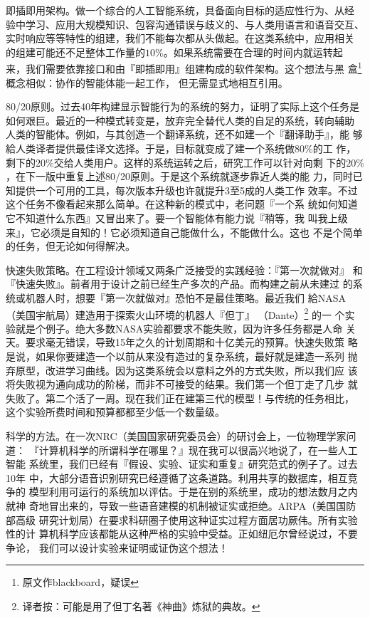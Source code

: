 \documentclass[12pt,a4paper]{article}
\begin{document}
即插即用架构。做一个综合的人工智能系统，具备面向目标的适应性行为、从经
验中学习、应用大规模知识、包容沟通错误与歧义的、与人类用语言和语音交互、
实时响应等等特性的组建，我们不能每次都从头做起。在这类系统中，应用相关
的组建可能还不足整体工作量的$10\%$。如果系统需要在合理的时间内就运转起
来，我们需要依靠接口和由『即插即用』组建构成的软件架构。这个想法与黑
盒\footnote{原文作blackboard，疑误} 概念相似：协作的智能体能一起工作，
但无需显式地相互引用。

80/20原则。过去40年构建显示智能行为的系统的努力，证明了实际上这个任务是
如何艰巨。最近的一种模式转变是，放弃完全替代人类的自足的系统，转向辅助
人类的智能体。例如，与其创造一个翻译系统，还不如建一个『翻译助手』，能
够給人类译者提供最佳译文选择。于是，目标就变成了建一个系统做$80\%$的工
作，剩下的$20\%$交给人类用户。这样的系统运转之后，研究工作可以针对向剩
下的$20\%$，在下一版中重复上述80/20原则。于是这个系统就逐步靠近人类的能
力，同时已知提供一个可用的工具，每次版本升级也许就提升3至5成的人类工作
效率。不过这个任务不像看起来那么简单。在这种新的模式中，老问题『一个系
统如何知道它不知道什么东西』又冒出来了。要一个智能体有能力说『稍等，我
叫我上级来』，它必须是自知的！它必须知道自己能做什么，不能做什么。这也
不是个简单的任务，但无论如何得解决。

快速失败策略。在工程设计领域又两条广泛接受的实践经验：『第一次就做对』
和『快速失败』。前者用于设计之前已经生产多次的产品。而构建之前从未建过
的系统或机器人时，想要『第一次就做对』恐怕不是最佳策略。最近我们
給NASA（美国宇航局）建造用于探索火山环境的机器人『但丁』
（Dante）\footnote{译者按：可能是用了但丁名著《神曲》炼狱的典故。} 的一
个实验就是个例子。绝大多数NASA实验都要求不能失败，因为许多任务都是人命
关天。要求毫无错误，导致15年之久的计划周期和十亿美元的预算。快速失败策
略是说，如果你要建造一个以前从来没有造过的复杂系统，最好就是建造一系列
抛弃原型，改进学习曲线。因为这类系统会以意料之外的方式失败，所以我们应
该将失败视为通向成功的阶梯，而非不可接受的结果。我们第一个但丁走了几步
就失败了。第二个活了一周。现在我们正在建第三代的模型！与传统的任务相比，
这个实验所费时间和预算都都至少低一个数量级。

科学的方法。在一次NRC（美国国家研究委员会）的研讨会上，一位物理学家问道：
『计算机科学的所谓科学在哪里？』现在我可以很高兴地说了，在一些人工智能
系统里，我们已经有『假设、实验、证实和重复』研究范式的例子了。过去10年
中，大部分语音识别研究已经遵循了这条道路。利用共享的数据库，相互竞争的
模型利用可运行的系统加以评估。于是在别的系统里，成功的想法数月之内就神
奇地冒出来的，导致一些语音建模的机制被证实或拒绝。ARPA（美国国防部高级
研究计划局）在要求科研圈子使用这种证实过程方面居功厥伟。所有实验性的计
算机科学应该都能从这种严格的实验中受益。正如纽厄尔曾经说过，不要争论，
我们可以设计实验来证明或证伪这个想法！
\end{document}
